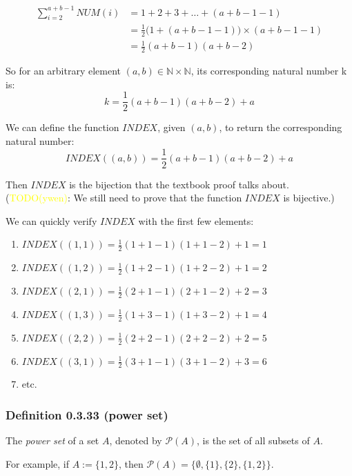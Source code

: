 \documentclass[12pt, letterpaper, oneside]{book}
\begin{document}
\begin{equation*}
  \begin{split}
    \sum_{i=2}^{a + b - 1} NUM(i)
    & = 1 + 2 + 3 + \ldots + (a + b - 1 - 1) \\
    & = \frac{1}{2}\bigl(1 + (a + b - 1 - 1)\bigr) \times (a + b - 1 - 1) \\
    & = \frac{1}{2}(a + b - 1)(a + b - 2)
  \end{split}
\end{equation*}

So for an arbitrary element $(a, b) \in \mathbb{N} \times \mathbb{N}$, its
corresponding natural number k is:
\[ k = \frac{1}{2}(a + b - 1)(a + b - 2) + a \]

We can define the function $INDEX$, given $(a, b)$, to return the corresponding
natural number:
\[ INDEX((a, b)) = \frac{1}{2}(a + b - 1)(a + b - 2) + a \]

Then $INDEX$ is the bijection that the textbook proof talks about.
(\colorbox{red!100}{\textcolor{yellow}{TODO(ywen)}}: We still need to prove that
the function $INDEX$ is bijective.)

We can quickly verify $INDEX$ with the first few elements:

\begin{enumerate}
  \item $INDEX((1, 1)) = \frac{1}{2}(1 + 1 - 1)(1 + 1 - 2) + 1 = 1$
  \item $INDEX((1, 2)) = \frac{1}{2}(1 + 2 - 1)(1 + 2 - 2) + 1 = 2$
  \item $INDEX((2, 1)) = \frac{1}{2}(2 + 1 - 1)(2 + 1 - 2) + 2 = 3$
  \item $INDEX((1, 3)) = \frac{1}{2}(1 + 3 - 1)(1 + 3 - 2) + 1 = 4$
  \item $INDEX((2, 2)) = \frac{1}{2}(2 + 2 - 1)(2 + 2 - 2) + 2 = 5$
  \item $INDEX((3, 1)) = \frac{1}{2}(3 + 1 - 1)(3 + 1 - 2) + 3 = 6$
  \item etc.
\end{enumerate}

\subsubsection{Definition 0.3.33 (power set)}

The \textit{power set} of a set $A$, denoted by $\mathcal{P}(A)$, is the set of
all subsets of $A$.

For example, if $A := \{1, 2\}$, then $\mathcal{P}(A) = \{\emptyset, \{1\},
  \{2\}, \{1, 2\}\}$.
\end{document}

